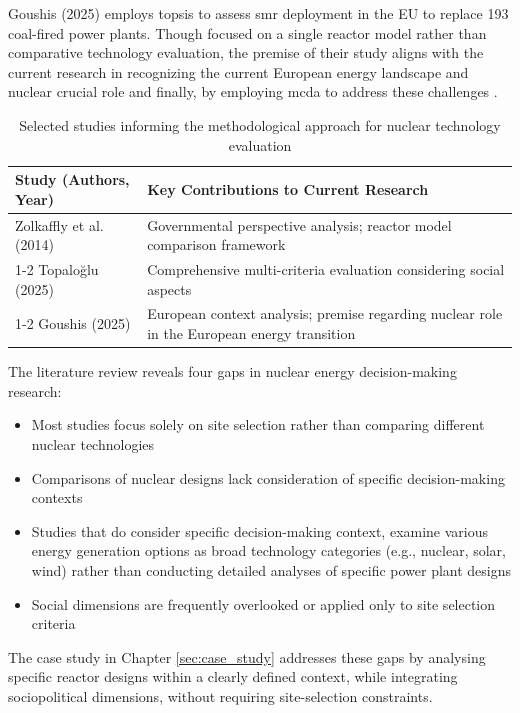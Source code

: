 Goushis (2025) employs \gls{topsis} to assess \gls{smr} deployment in the EU to replace 193 coal-fired power plants. Though focused on a single reactor model rather than comparative technology evaluation, the premise of their study aligns with the current research in recognizing the current European energy landscape and nuclear crucial role and finally, by employing \gls{mcda} to address these challenges \cite{GOUSHIS2025126565}.

\begin{table}[htbp]
    \centering
    \begin{tabularx}{\textwidth}{lX}
        \toprule
        \textbf{Study (Authors, Year)} & \textbf{Key Contributions to Current Research} \\
        \midrule
        Zolkaffly et al. (2014) \cite{10.1063/1.4866099} & Governmental perspective analysis; reactor model comparison framework \\
        \cmidrule(lr){1-2}
        Topaloğlu (2025) \cite{TOPALOGLU2025103228} & Comprehensive multi-criteria evaluation considering social aspects  \\
        \cmidrule(lr){1-2}
        Goushis (2025) \cite{GOUSHIS2025126565} & European context analysis; premise regarding nuclear role in the European energy transition \\
        \bottomrule
    \end{tabularx}
    \caption{Selected studies informing the methodological approach for nuclear technology evaluation}
    \label{tab:nuclear_study_comparison}
\end{table}

The literature review reveals four gaps in nuclear energy decision-making research: 
\begin{itemize}
    \item Most studies focus solely on site selection rather than comparing different nuclear technologies
    \item Comparisons of nuclear designs lack consideration of specific decision-making contexts
    \item Studies that do consider specific decision-making context, examine various energy generation options as broad technology categories (e.g., nuclear, solar, wind) rather than conducting detailed analyses of specific power plant designs
    \item Social dimensions are frequently overlooked or applied only to site selection criteria
\end{itemize}
The case study in Chapter \ref{sec:case_study} addresses these gaps by analysing specific reactor designs within a clearly defined context, while integrating sociopolitical dimensions, without requiring site-selection constraints.


